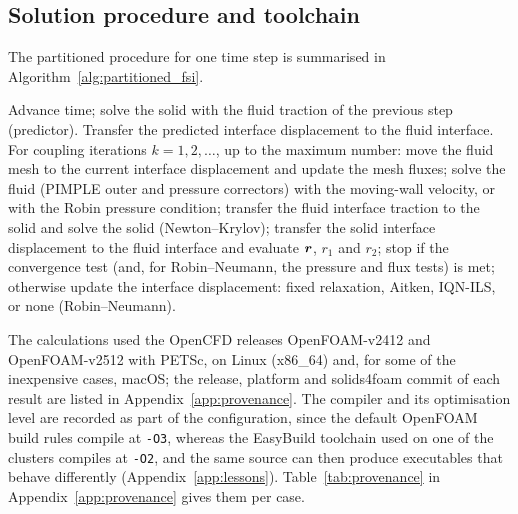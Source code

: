 \subsection{Solution procedure and toolchain}\label{sec:implementation_details}

The partitioned procedure for one time step is summarised in Algorithm~\ref{alg:partitioned_fsi}.

\begin{algorithm}[htbp]
\caption{Partitioned FSI procedure for one time step (solids4foam \texttt{fluidSolidInterface}).}
\label{alg:partitioned_fsi}
\begin{algorithmic}[1]
\State Advance time; solve the solid with the fluid traction of the previous step (predictor).
\State Transfer the predicted interface displacement to the fluid interface.
\State For coupling iterations $k = 1, 2, \ldots$, up to the maximum number:
\State \hspace{1.5em}move the fluid mesh to the current interface displacement and update the mesh fluxes;
\State \hspace{1.5em}solve the fluid (PIMPLE outer and pressure correctors) with the moving-wall velocity, or with the Robin pressure condition;
\State \hspace{1.5em}transfer the fluid interface traction to the solid and solve the solid (Newton--Krylov);
\State \hspace{1.5em}transfer the solid interface displacement to the fluid interface and evaluate $\boldsymbol{r}$, $r_1$ and $r_2$;
\State \hspace{1.5em}stop if the convergence test (and, for Robin--Neumann, the pressure and flux tests) is met;
\State \hspace{1.5em}otherwise update the interface displacement: fixed relaxation, Aitken, IQN-ILS, or none (Robin--Neumann).
\end{algorithmic}
\end{algorithm}

The calculations used the OpenCFD releases OpenFOAM-v2412 and OpenFOAM-v2512 with PETSc, on Linux (x86\_64) and, for some of the inexpensive cases, macOS; the release, platform and solids4foam commit of each result are listed in Appendix~\ref{app:provenance}.
The compiler and its optimisation level are recorded as part of the configuration, since the default OpenFOAM build rules compile at \texttt{-O3}, whereas the EasyBuild toolchain used on one of the clusters compiles at \texttt{-O2}, and the same source can then produce executables that behave differently (Appendix~\ref{app:lessons}).
Table~\ref{tab:provenance} in Appendix~\ref{app:provenance} gives them per case.

